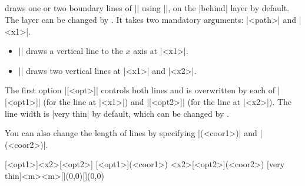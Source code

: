 \begin{tzcode}{.3}
{}
\end{tzcode}


\subsection{\protect{}}

\icmd{\tzfnarealine} draws one or two boundary lines of |\tzfnarea| using |\tzto|, on the |behind| layer by default. The layer can be changed by \icmd{\settzfnarealayer}.
It takes two mandatory arguments: |{<path>}| and |{<x1>}|.
\begin{itemize}\firmlist
\item || draws a vertical line to the $x$ axis at |<x1>|.
\item || draws two vertical lines at |<x1>| and |<x2>|.
\end{itemize}

The first option |[<opt>]| controls both lines and is overwritten by each of |[<opt1>]| (for the line at |<x1>|)  and |[<opt2>]| (for the line at |<x2>|).
The line width is |very thin| by default, which can be changed by \icmd{\settzfnarealinestyle}.

You can also change the length of lines by specifying |(<coor1>)| and |(<coor2>)|.

\begin{tzdef}
[<opt1>]{<x2>}[<opt2>]
[<opt1>](<coor1>)
                            {<x2>}[<opt2>](<coor2>)
  [very thin]{<m>}{<m>}[](0,0){}[](0,0)
\end{tzdef}


\begin{tzcode}{.3}
{}
\end{tzcode}

